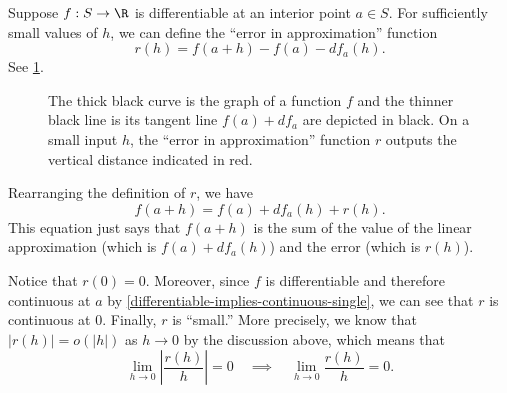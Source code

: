 \begin{remark} \label{error-in-approximation}
	Suppose $f : S \to \R$ is differentiable at an interior point $a \in S$. For sufficiently small values of $h$, we can define the ``error in approximation'' function
	\[ r(h) = f(a+h) - f(a) - df_a(h). \]
	See \cref{figure-error-in-approximation}. 
	\begin{figure}
		\begin{center}
		\end{center}
		\caption{The thick black curve is the graph of a function $f$ and the thinner black line is its tangent line $f(a) + df_a$ are depicted in black. On a small input $h$, the ``error in approximation'' function $r$ outputs the vertical distance indicated in red.}  \label{figure-error-in-approximation}
	\end{figure}
	Rearranging the definition of $r$, we have
	\[ f(a+h) = f(a) + df_a(h) + r(h). \]
	This equation just says that $f(a+h)$ is the sum of the value of the linear approximation (which is $f(a) + df_a(h)$) and the error (which is $r(h)$). 
	
	Notice that $r(0) = 0$. Moreover, since $f$ is differentiable and therefore continuous at $a$ by \cref{differentiable-implies-continuous-single}, we can see that $r$ is continuous at 0. Finally, $r$ is ``small.'' More precisely, we know that $|r(h)| = o(|h|)$ as $h \to 0$ by the discussion above, which means that
	\[ \lim_{h \to 0} \left| \frac{r(h)}{h} \right| = 0 \quad \implies \quad \lim_{h \to 0} \frac{r(h)}{h} = 0. \]
\end{remark} 

